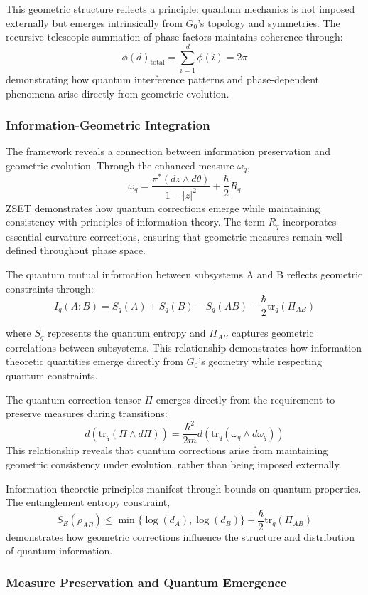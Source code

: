 \documentclass[10pt]{article}
\begin{document}
This geometric structure reflects a principle: quantum mechanics is not imposed externally but emerges intrinsically from \(G_0\)'s topology and symmetries. The recursive-telescopic summation of phase factors maintains coherence through:
\[
\phi(d)_{\text{total}} = \sum_{i=1}^d \phi(i) = 2\pi
\]
demonstrating how quantum interference patterns and phase-dependent phenomena arise directly from geometric evolution.

\subsubsection{Information-Geometric Integration}

The framework reveals a connection between information preservation and geometric evolution. Through the enhanced measure \(\omega_q\),
\[
\omega_q = \frac{\pi^*(dz \wedge d\theta)}{1 - |z|^2} + \frac{\hbar}{2}R_q
\]
ZSET demonstrates how quantum corrections emerge while maintaining consistency with principles of information theory. The term \(R_q\) incorporates essential curvature corrections, ensuring that geometric measures remain well-defined throughout phase space.

The quantum mutual information between subsystems A and B reflects geometric constraints through:
\[
I_q(A:B) = S_q(A) + S_q(B) - S_q(AB) - \frac{\hbar}{2}\text{tr}_q(\Pi_{AB})
\]

where $S_q$ represents the quantum entropy and $\Pi_{AB}$ captures geometric correlations between subsystems. This relationship demonstrates how information theoretic quantities emerge directly from $G_0$'s geometry while respecting quantum constraints.

The quantum correction tensor \(\Pi\) emerges directly from the requirement to preserve measures during transitions:
\[
d(\text{tr}_q(\Pi \wedge d\Pi)) = \frac{\hbar^2}{2m}d(\text{tr}_q(\omega_q \wedge d\omega_q))
\]
This relationship reveals that quantum corrections arise from maintaining geometric consistency under evolution, rather than being imposed externally.

Information theoretic principles manifest through bounds on quantum properties. The entanglement entropy constraint,
\[
S_E(\rho_{AB}) \leq \min\{\log(d_A), \log(d_B)\} + \frac{\hbar}{2}\text{tr}_q(\Pi_{AB})
\]
demonstrates how geometric corrections influence the structure and distribution of quantum information.

\subsubsection{Measure Preservation and Quantum Emergence}
\end{document}
